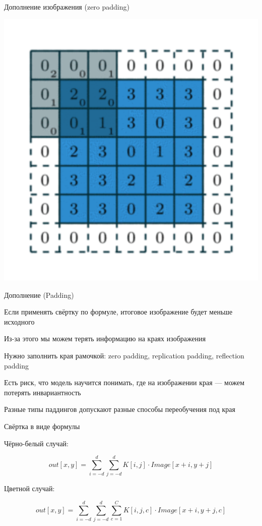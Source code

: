 \documentclass[notes,12pt, aspectratio=169]{beamer}
\newenvironment{wideitemize}{\itemize\addtolength{\itemsep}{10pt}}{\enditemize}
\begin{document}
\begin{frame}{Дополнение изображения (zero padding)}
\begin{center}
	\includegraphics[width=.4\linewidth]{padding.png}
\end{center}
\end{frame}


\begin{frame}{Дополнение (Padding)}
\begin{wideitemize}
	\item Если применять свёртку по формуле, итоговое изображение будет меньше исходного
	\item Из-за этого мы можем терять информацию на краях изображения
	\item Нужно заполнить края рамочкой: zero padding, replication padding, reflection padding
	\item Есть риск, что модель научится понимать, где на изображении края — можем потерять инвариантность
	\item Разные типы паддингов допускают разные способы переобучения под края
\end{wideitemize}
\end{frame}


\begin{frame}{Свёртка в виде формулы}

Чёрно-белый случай:

\[
out[x, y] = \sum_{i = -d}^{d}  \sum_{j= -d}^{d}   K[i, j] \cdot Image[x + i, y + j]
\]

Цветной случай: 

\[
out[x, y] = \sum_{i = -d}^{d}  \sum_{j= -d}^{d}  \sum_{c= 1}^{C}  K[i, j, c] \cdot Image[x + i, y + j, c]
\]

\end{frame}
\end{document}
